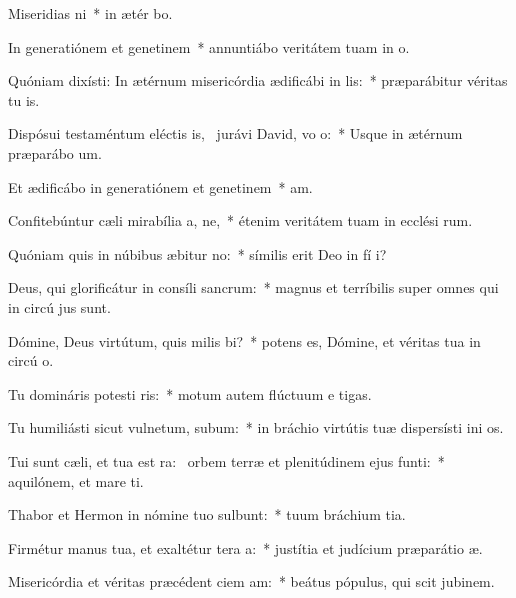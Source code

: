 \item Miseridias ni~* in ætér bo.
\item In generatiónem et genetinem~* annuntiábo veritátem tuam in  o.
\item Quóniam dixísti: In ætérnum misericórdia ædificábi in lis:~* præparábitur véritas tu  is.
\item Dispósui testaméntum eléctis is,~\pscross{} jurávi David, vo o:~* Usque in ætérnum præparábo  um.
\item Et ædificábo in generatiónem et genetinem~*  am.
\item Confitebúntur cæli mirabília a, ne,~* étenim veritátem tuam in ecclési rum.
\item Quóniam quis in núbibus æbitur no:~* símilis erit Deo in fí i?
\item Deus, qui glorificátur in consíli sancrum:~* magnus et terríbilis super omnes qui in circú jus sunt.
\item Dómine, Deus virtútum, quis milis bi?~* potens es, Dómine, et véritas tua in circú o.
\item Tu domináris potesti ris:~* motum autem flúctuum e  tigas.
\item Tu humiliásti sicut vulnetum, subum:~* in bráchio virtútis tuæ dispersísti ini os.
\item Tui sunt cæli, et tua est ra:~\pscross{} orbem terræ et plenitúdinem ejus  funti:~* aquilónem, et mare  ti.
\item Thabor et Hermon in nómine tuo sulbunt:~* tuum bráchium  tia.
\item Firmétur manus tua, et exaltétur tera a:~* justítia et judícium præparátio  æ.
\item Misericórdia et véritas præcédent ciem am:~* beátus pópulus, qui scit jubinem.

